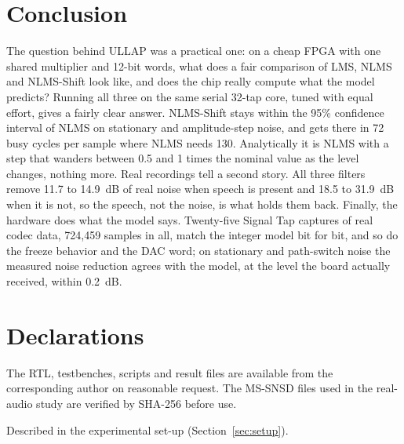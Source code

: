 \section{Conclusion}\label{sec:concl}
The question behind ULLAP was a practical one: on a cheap FPGA with one shared multiplier and 12-bit
words, what does a fair comparison of LMS, NLMS and NLMS-Shift look like, and does the chip really compute
what the model predicts? Running all three on the same serial 32-tap core, tuned with equal effort, gives
a fairly clear answer. NLMS-Shift stays within the 95\% confidence interval of NLMS on stationary and
amplitude-step noise, and gets there in 72 busy cycles per sample where NLMS needs 130. Analytically it is
NLMS with a step that wanders between 0.5 and 1 times the nominal value as the level changes, nothing
more. Real recordings tell a second story. All three filters remove 11.7 to 14.9~dB of real noise when
speech is present and 18.5 to 31.9~dB when it is not, so the speech, not the noise, is what holds them
back. Finally, the hardware does what the model says. Twenty-five Signal Tap captures of real codec data,
724,459 samples in all, match the integer model bit for bit, and so do the freeze behavior and the DAC
word; on stationary and path-switch noise the measured noise reduction agrees with the model, at the level
the board actually received, within 0.2~dB.

\section*{Declarations}
 

 

 

The RTL, testbenches, scripts and result files are available from the corresponding author on reasonable
request. The MS-SNSD files used in the real-audio study are verified by SHA-256 before use.

 Described in the experimental set-up (Section~\ref{sec:setup}).
